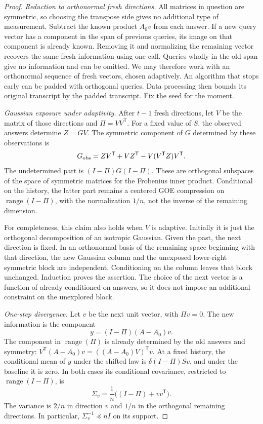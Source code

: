 \begin{proof}
\emph{Reduction to orthonormal fresh directions.}
All matrices in question are symmetric, so choosing the transpose side gives
no additional type of measurement. Subtract the known product $A_0v$ from
each answer. If a new query vector has a component in the span of previous
queries, its image on that component is already known. Removing it and
normalizing the remaining vector recovers the same fresh information using
one call. Queries wholly in the old span give no information and can be
omitted. We may therefore work with an orthonormal sequence of fresh vectors,
chosen adaptively. An algorithm that stops early can be padded with
orthogonal queries. Data processing then bounds its original transcript by
the padded transcript. Fix the seed for the moment.

\emph{Gaussian exposure under adaptivity.}
After $t-1$ fresh directions, let $V$ be the matrix of those directions and
$\Pi=VV^{\mathsf T}$. For a fixed value of $S$, the observed answers determine
$Z=GV$. The symmetric component of $G$ determined by these observations is
\begin{equation}\label{eq:observedcomponent}
 G_{\rm obs}=ZV^{\mathsf T}+VZ^{\mathsf T}
             -V(V^{\mathsf T}Z)V^{\mathsf T}.
\end{equation}
The undetermined part is $(I-\Pi)G(I-\Pi)$. These are orthogonal subspaces of
the space of symmetric matrices for the Frobenius inner product. Conditional
on the history, the latter part remains a centered GOE compression on
$\operatorname{range}(I-\Pi)$, with the normalization $1/n$, not the inverse
of the remaining dimension.

For completeness, this claim also holds when $V$ is adaptive. Initially it
is just the orthogonal decomposition of an isotropic Gaussian. Given the
past, the next direction is fixed. In an orthonormal basis of the remaining
space beginning with that direction, the new Gaussian column and the
unexposed lower-right symmetric block are independent. Conditioning on the
column leaves that block unchanged. Induction proves the assertion. The
choice of the next vector is a function of already conditioned-on answers,
so it does not impose an additional constraint on the unexplored block.

\emph{One-step divergence.}
Let $v$ be the next unit vector, with $\Pi v=0$. The new information is the
component
\[
 y=(I-\Pi)(A-A_0)v.
\]
The component in $\operatorname{range}(\Pi)$ is already determined by the old
answers and symmetry:
$V^{\mathsf T}(A-A_0)v=((A-A_0)V)^{\mathsf T}v$.
At a fixed history, the conditional mean of $y$ under the shifted law is
$\delta(I-\Pi)Sv$, and under the baseline it is zero. In both cases its
conditional covariance, restricted to $\operatorname{range}(I-\Pi)$, is
\begin{equation}\label{eq:covariance}
 \Sigma_v=\frac1n\bigl((I-\Pi)+vv^{\mathsf T}\bigr).
\end{equation}
The variance is $2/n$ in direction $v$ and $1/n$ in the orthogonal remaining
directions. In particular, $\Sigma_v^{-1}\preceq nI$ on its support.


\end{proof}
